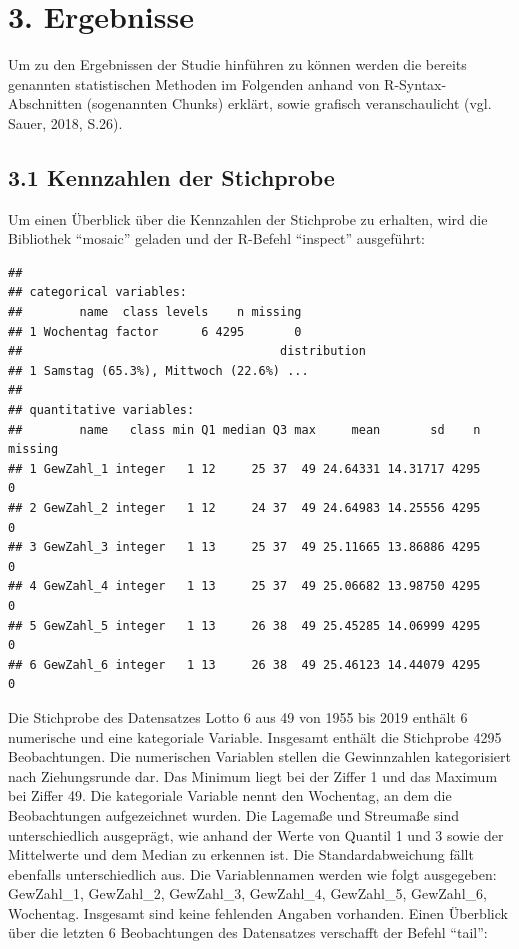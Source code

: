\documentclass[ngerman,]{article}
\begin{document}
\section{3. Ergebnisse}\label{ergebnisse}

Um zu den Ergebnissen der Studie hinführen zu können werden die bereits
genannten statistischen Methoden im Folgenden anhand von
R-Syntax-Abschnitten (sogenannten Chunks) erklärt, sowie grafisch
veranschaulicht (vgl. Sauer, 2018, S.26).

\subsection{3.1 Kennzahlen der
Stichprobe}\label{kennzahlen-der-stichprobe}

Um einen Überblick über die Kennzahlen der Stichprobe zu erhalten, wird
die Bibliothek ``mosaic'' geladen und der R-Befehl ``inspect''
ausgeführt:

\begin{verbatim}
## 
## categorical variables:  
##        name  class levels    n missing
## 1 Wochentag factor      6 4295       0
##                                    distribution
## 1 Samstag (65.3%), Mittwoch (22.6%) ...        
## 
## quantitative variables:  
##        name   class min Q1 median Q3 max     mean       sd    n missing
## 1 GewZahl_1 integer   1 12     25 37  49 24.64331 14.31717 4295       0
## 2 GewZahl_2 integer   1 12     24 37  49 24.64983 14.25556 4295       0
## 3 GewZahl_3 integer   1 13     25 37  49 25.11665 13.86886 4295       0
## 4 GewZahl_4 integer   1 13     25 37  49 25.06682 13.98750 4295       0
## 5 GewZahl_5 integer   1 13     26 38  49 25.45285 14.06999 4295       0
## 6 GewZahl_6 integer   1 13     26 38  49 25.46123 14.44079 4295       0
\end{verbatim}

Die Stichprobe des Datensatzes Lotto 6 aus 49 von 1955 bis 2019 enthält
6 numerische und eine kategoriale Variable. Insgesamt enthält die
Stichprobe 4295 Beobachtungen. Die numerischen Variablen stellen die
Gewinnzahlen kategorisiert nach Ziehungsrunde dar. Das Minimum liegt bei
der Ziffer 1 und das Maximum bei Ziffer 49. Die kategoriale Variable
nennt den Wochentag, an dem die Beobachtungen aufgezeichnet wurden. Die
Lagemaße und Streumaße sind unterschiedlich ausgeprägt, wie anhand der
Werte von Quantil 1 und 3 sowie der Mittelwerte und dem Median zu
erkennen ist. Die Standardabweichung fällt ebenfalls unterschiedlich
aus. Die Variablennamen werden wie folgt ausgegeben: GewZahl\_1,
GewZahl\_2, GewZahl\_3, GewZahl\_4, GewZahl\_5, GewZahl\_6, Wochentag.
Insgesamt sind keine fehlenden Angaben vorhanden. Einen Überblick über
die letzten 6 Beobachtungen des Datensatzes verschafft der Befehl
``tail'':
\end{document}
